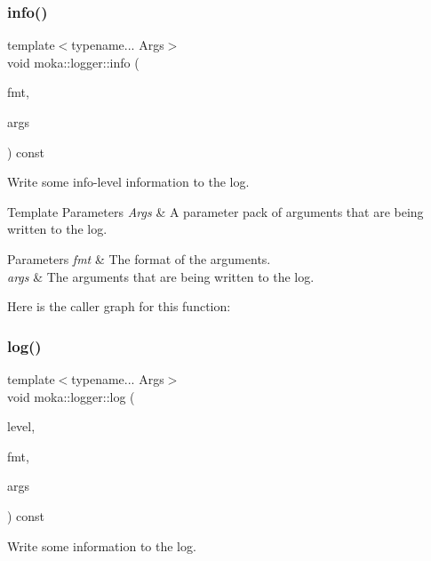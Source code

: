 \subsubsection{\texorpdfstring{info()}{info()}}
{\footnotesize\ttfamily template$<$typename... Args$>$ \\
void moka\+::logger\+::info (\begin{DoxyParamCaption}\item[{const char $\ast$}]{fmt,  }\item[{Args \&\&...}]{args }\end{DoxyParamCaption}) const}



Write some info-\/level information to the log. 


\begin{DoxyTemplParams}{Template Parameters}
{\em Args} & A parameter pack of arguments that are being written to the log. \\
\hline
\end{DoxyTemplParams}

\begin{DoxyParams}{Parameters}
{\em fmt} & The format of the arguments. \\
\hline
{\em args} & The arguments that are being written to the log. \\
\hline
\end{DoxyParams}
Here is the caller graph for this function\+:
\mbox{\label{classmoka_1_1logger_a826aeeb2fcae75b99c72eb9c82b5fa13}} 
\subsubsection{\texorpdfstring{log()}{log()}}
{\footnotesize\ttfamily template$<$typename... Args$>$ \\
void moka\+::logger\+::log (\begin{DoxyParamCaption}\item[{\mbox{\hyperlink{namespacemoka_a7c4111664aee7737c54ab37376b2637d}{log\+\_\+level}}}]{level,  }\item[{const char $\ast$}]{fmt,  }\item[{Args \&\&...}]{args }\end{DoxyParamCaption}) const}



Write some information to the log. 


